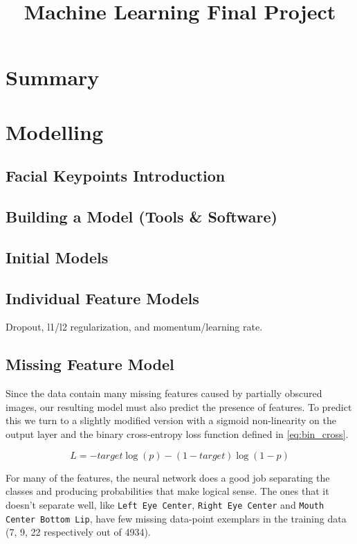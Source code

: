\documentclass[conference]{IEEEtran}
\begin{document}
\title{Machine Learning Final Project}
\author{
\and
{}
}

\maketitle

\section{Summary}

\section{Modelling}
\subsection{Facial Keypoints Introduction}
\subsection{Building a Model (Tools \& Software)}
\subsection{Initial Models}
\subsection{Individual Feature Models}
Dropout, l1/l2 regularization, and momentum/learning rate.
\subsection{Missing Feature Model}
Since the data contain many missing features caused by partially obscured images, our resulting model must also predict the presence of features.  To predict this we turn to a slightly modified version with a sigmoid non-linearity on the output layer and the binary cross-entropy loss function defined in \cref{eq:bin_cross}.

\[\label{eq:bin_cross}
 L = -target \log(p) - (1 - target) \log(1 - p)
\]

For many of the features, the neural network does a good job separating the classes and producing probabilities that make logical sense.  The ones that it doesn't separate well, like \texttt{Left Eye Center}, \texttt{Right Eye Center} and \texttt{Mouth Center Bottom Lip}, have few missing data-point exemplars in the training data (7, 9, 22 respectively out of 4934).
\end{document}
